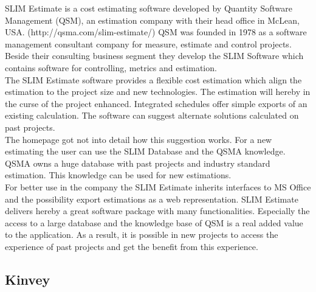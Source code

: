 SLIM Estimate is a cost estimating software developed by Quantity Software Management (QSM), an estimation company with their head office in McLean, USA. (http://qsma.com/slim-estimate/) QSM was founded in 1978 as a software management consultant company for measure, estimate and control projects. Beside their consulting business segment they develop the SLIM Software which contains software for controlling, metrics and estimation.
\\
The SLIM Estimate software provides a flexible cost estimation which align the estimation to the project size and new technologies. The estimation will hereby in the curse of the project enhanced. Integrated schedules offer simple exports of an existing calculation. The software can suggest alternate solutions calculated on past projects.
\\
The homepage got not into detail how this suggestion works. For a new estimating the user can use the SLIM Database and the QSMA knowledge. QSMA owns a huge database with past projects and industry standard estimation. This knowledge can be used for new estimations.
\\
For better use in the company the SLIM Estimate inherits interfaces to MS Office and the possibility export estimations as a web representation. SLIM Estimate delivers hereby a great software package with many functionalities. Especially the access to a large database and the knowledge base of QSM is a real added value to the application. As a result, it is possible in new projects to access the experience of past projects and get the benefit from this experience.


\subsection{Kinvey}

